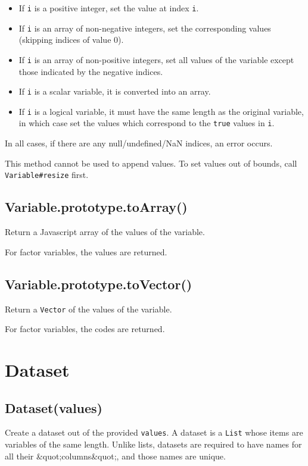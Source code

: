 \documentclass{article}
\begin{document}
\begin{itemize}

\item If \texttt{i} is a positive integer, set the value at index \texttt{i}.

\item If \texttt{i} is an array of non-negative integers, set
the corresponding values (skipping indices of value 0).

\item If \texttt{i} is an array of non-positive integers, set
all values of the variable except those indicated by the negative indices.

\item If \texttt{i} is a scalar variable, it is converted into an array.

\item If \texttt{i} is a logical variable, it must have the same length as the original
variable, in which case set the values which correspond to the \texttt{true}
values in \texttt{i}.

\end{itemize}

In all cases, if there are any null/undefined/NaN indices, an error occurs.


This method cannot be used to append values. To set values out of bounds,
call \texttt{Variable\#resize} first.


    \subsection{Variable.prototype.toArray()}
    Return a Javascript array of the values of the variable.


For factor variables, the values are returned.


    \subsection{Variable.prototype.toVector()}
    Return a \texttt{Vector} of the values of the variable.


For factor variables, the codes are returned.


  \section{Dataset}
    \subsection{Dataset(values)}
    Create a dataset out of the provided \texttt{values}. A dataset is a \texttt{List} whose items
are variables of the same length. Unlike lists, datasets are required to have names
for all their \&quot;columns\&quot;, and those names are unique.
\end{document}
